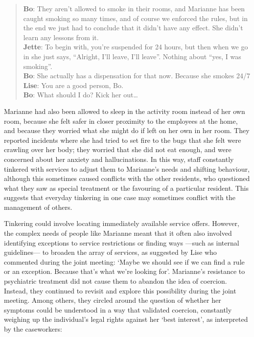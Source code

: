     \blockquote{\textnormal{\bfseries Bo}:	They aren’t allowed to smoke in their rooms, and Marianne has been caught smoking so many times, and of course we enforced the rules, but in the end we just had to conclude that it didn’t have any effect. She didn’t learn any lessons from it.
    \\\textnormal{\bfseries Jette}: 	To begin with, you’re suspended for 24 hours, but then when we go in she just says, “Alright, I’ll leave, I’ll leave”. Nothing about “yes, I was smoking”.
    \\\textnormal{\bfseries Bo}:	She actually has a dispensation for that now. Because she smokes 24/7
    \\\textnormal{\bfseries Lise}:	You are a good person, Bo.
    \\\textnormal{\bfseries Bo}: 	What should I do? Kick her out…}
Marianne had also been allowed to sleep in the activity room instead of her own room, because she felt safer in closer proximity to the employees at the home, and because they worried what she might do if left on her own in her room. They reported incidents where she had tried to set fire to the bugs that she felt were crawling over her body; they worried that she did not eat enough, and were concerned about her anxiety and hallucinations. In this way, staff constantly tinkered with services to adjust them to Marianne’s needs and shifting behaviour, although this sometimes caused conflicts with the other residents, who questioned what they saw as special treatment or the favouring of a particular resident. This suggests that everyday tinkering in one case may sometimes conflict with the management of others.
\par
Tinkering could involve locating immediately available service offers. However, the complex needs of people like Marianne meant that it often also involved identifying exceptions to service restrictions or finding ways ---such as internal guidelines--- to broaden the array of services, as suggested by Lise who commented during the joint meeting: ‘Maybe we should see if we can find a rule or an exception. Because that’s what we’re looking for’. Marianne’s resistance to psychiatric treatment did not cause them to abandon the idea of coercion. Instead, they continued to revisit and explore this possibility during the joint meeting. Among others, they circled around the question of whether her symptoms could be understood in a way that validated coercion, constantly weighing up the individual’s legal rights against her ‘best interest’, as interpreted by the caseworkers:
